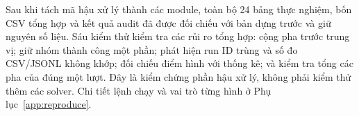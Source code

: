 Sau khi tách mã hậu xử lý thành các module, toàn bộ 24 bảng thực nghiệm, bốn CSV tổng hợp và kết quả audit đã được đối chiếu với bản dựng trước và giữ nguyên số liệu. Sáu kiểm thử kiểm tra các rủi ro tổng hợp: cộng pha trước trung vị; giữ nhóm thành công một phần; phát hiện run ID trùng và số đo CSV/JSONL không khớp; đối chiếu điểm hình với thống kê; và kiểm tra tổng các pha của đúng một lượt. Đây là kiểm chứng phần hậu xử lý, không phải kiểm thử thêm các solver. Chi tiết lệnh chạy và vai trò từng hình ở Phụ lục~\ref{app:reproduce}.
